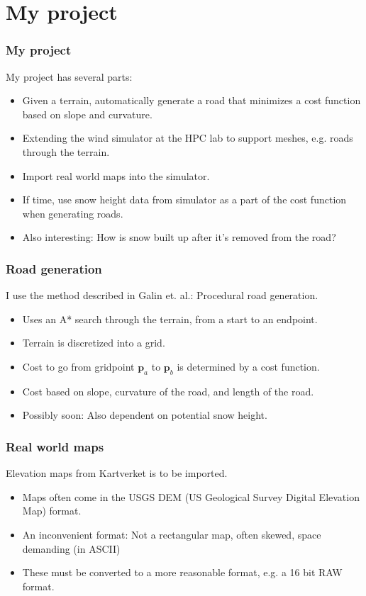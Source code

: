 \section{My project}

\begin{frame}
\frametitle{My project}
My project has several parts:
\begin{itemize}
\item Given a terrain, automatically generate a road that minimizes a cost function based on slope and curvature.
\item Extending the wind simulator at the HPC lab to support meshes, e.g. roads through the terrain.
\item Import real world maps into the simulator.
\item If time, use snow height data from simulator as a part of the cost function when generating roads.
\item Also interesting: How is snow built up after it's removed from the road?
\end{itemize}
\end{frame}

\begin{frame}
\frametitle{Road generation}
I use the method described in Galin et. al.: Procedural road generation.
\begin{itemize}
\item Uses an A* search through the terrain, from a start to an endpoint.
\item Terrain is discretized into a grid.
\item Cost to go from gridpoint $\mathbf{p}_a$ to $\mathbf{p}_b$ is determined by a cost function.
\item Cost based on slope, curvature of the road, and length of the road.
\item Possibly soon: Also dependent on potential snow height.
\end{itemize}
\end{frame}

\begin{frame}
\frametitle{Real world maps}
Elevation maps from Kartverket is to be imported.
\begin{itemize}
\item Maps often come in the USGS DEM (US Geological Survey Digital Elevation Map) format.
\item An inconvenient format: Not a rectangular map, often skewed, space demanding (in ASCII)
\item These must be converted to a more reasonable format, e.g. a 16 bit RAW format.
\end{itemize}
\end{frame}

